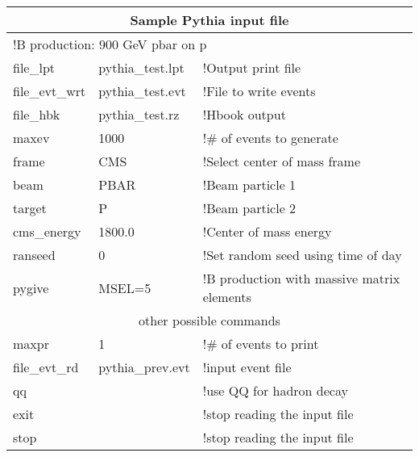 \vspace{0.2 in}

\begin{tabular}{|lll|} \hline
\multicolumn{3}{|c|}{Sample Pythia input file} \\  \hline
\multicolumn{3}{|l|}{!B production: 900 GeV pbar on p} \\
file\_lpt     & pythia\_test.lpt & !Output print file \\
file\_evt\_wrt & pythia\_test.evt & !File to write events \\
file\_hbk     & pythia\_test.rz  & !Hbook output \\
maxev        & 1000            & !\# of events to generate \\
frame        & CMS             & !Select center of mass frame \\
beam         & PBAR            & !Beam particle 1 \\
target       & P               & !Beam particle 2 \\
cms\_energy   & 1800.0          & !Center of mass energy \\
ranseed      & 0               & !Set random seed using time of day \\
pygive       & MSEL=5          & !B production with massive matrix elements \\ \hline
\multicolumn{3}{|c|}{other possible commands} \\  \hline
maxpr        & 1               & !\# of events to print \\
file\_evt\_rd  & pythia\_prev.evt & !input event file \\
qq           &                 & !use QQ for hadron decay \\
exit         &                 & !stop reading the input file  \\
stop         &                 & !stop reading the input file  \\ \hline
\end{tabular}

\vspace{0.2 in}

